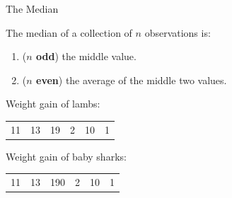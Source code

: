 \begin{frame}{The Median}

    The \alert{median} of a collection of $n$ observations
    is:
    \begin{enumerate}
        \item (\textbf{$n$ odd}) the middle value.
        \item (\textbf{$n$ even}) the average of the middle two values.
    \end{enumerate}

    \vspace{3em}
    \pause

     Weight gain of lambs:
    \begin{center}
        \begin{tabular}{cccccc}
            11 & 13 & 19 & 2 & 10 & 1
        \end{tabular}
    \end{center}

    \pause

    \vspace{3em}

     Weight gain of baby sharks:
    \begin{center}
        \begin{tabular}{cccccc}
            11 & 13 & 190 & 2 & 10 & 1
        \end{tabular}
    \end{center}

\end{frame}


